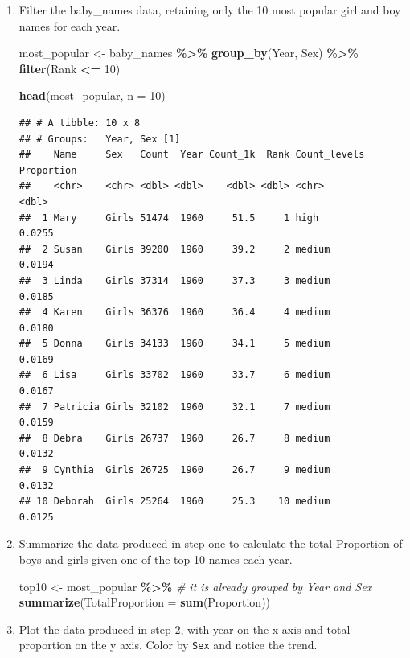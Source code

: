\documentclass[
]{book}
\newenvironment{Shaded}{\begin{snugshade}}{\end{snugshade}}
\newcommand{\CommentTok}[1]{\textcolor[rgb]{0.56,0.35,0.01}{\textit{#1}}}
\newcommand{\DataTypeTok}[1]{\textcolor[rgb]{0.13,0.29,0.53}{#1}}
\newcommand{\DecValTok}[1]{\textcolor[rgb]{0.00,0.00,0.81}{#1}}
\newcommand{\KeywordTok}[1]{\textcolor[rgb]{0.13,0.29,0.53}{\textbf{#1}}}
\newcommand{\NormalTok}[1]{#1}
\newcommand{\OperatorTok}[1]{\textcolor[rgb]{0.81,0.36,0.00}{\textbf{#1}}}
\newcommand{\StringTok}[1]{\textcolor[rgb]{0.31,0.60,0.02}{#1}}
\begin{document}
\begin{alert}

\begin{enumerate}
\def\labelenumi{\arabic{enumi}.}
\item
  Filter the baby\_names data, retaining only the 10 most popular girl and boy names for each year.

\begin{Shaded}
\begin{Highlighting}[]
\NormalTok{most\_popular \textless{}{-}}\StringTok{ }
\StringTok{  }\NormalTok{baby\_names }\OperatorTok{\%\textgreater{}\%}\StringTok{ }
\StringTok{  }\KeywordTok{group\_by}\NormalTok{(Year, Sex) }\OperatorTok{\%\textgreater{}\%}
\StringTok{  }\KeywordTok{filter}\NormalTok{(Rank }\OperatorTok{\textless{}=}\StringTok{ }\DecValTok{10}\NormalTok{)}

\KeywordTok{head}\NormalTok{(most\_popular, }\DataTypeTok{n =} \DecValTok{10}\NormalTok{)}
\end{Highlighting}
\end{Shaded}

\begin{verbatim}
## # A tibble: 10 x 8
## # Groups:   Year, Sex [1]
##    Name     Sex   Count  Year Count_1k  Rank Count_levels Proportion
##    <chr>    <chr> <dbl> <dbl>    <dbl> <dbl> <chr>             <dbl>
##  1 Mary     Girls 51474  1960     51.5     1 high             0.0255
##  2 Susan    Girls 39200  1960     39.2     2 medium           0.0194
##  3 Linda    Girls 37314  1960     37.3     3 medium           0.0185
##  4 Karen    Girls 36376  1960     36.4     4 medium           0.0180
##  5 Donna    Girls 34133  1960     34.1     5 medium           0.0169
##  6 Lisa     Girls 33702  1960     33.7     6 medium           0.0167
##  7 Patricia Girls 32102  1960     32.1     7 medium           0.0159
##  8 Debra    Girls 26737  1960     26.7     8 medium           0.0132
##  9 Cynthia  Girls 26725  1960     26.7     9 medium           0.0132
## 10 Deborah  Girls 25264  1960     25.3    10 medium           0.0125
\end{verbatim}
\item
  Summarize the data produced in step one to calculate the total Proportion of boys and girls given one of the top 10 names each year.

\begin{Shaded}
\begin{Highlighting}[]
\NormalTok{top10 \textless{}{-}}\StringTok{ }
\StringTok{  }\NormalTok{most\_popular }\OperatorTok{\%\textgreater{}\%}\StringTok{ }\CommentTok{\# it is already grouped by Year and Sex}
\StringTok{  }\KeywordTok{summarize}\NormalTok{(}\DataTypeTok{TotalProportion =} \KeywordTok{sum}\NormalTok{(Proportion))}
\end{Highlighting}
\end{Shaded}
\item
  Plot the data produced in step 2, with year on the x-axis and total proportion on the y axis. Color by \texttt{Sex} and notice
  the trend.


\end{enumerate}
\end{alert}
\end{document}
